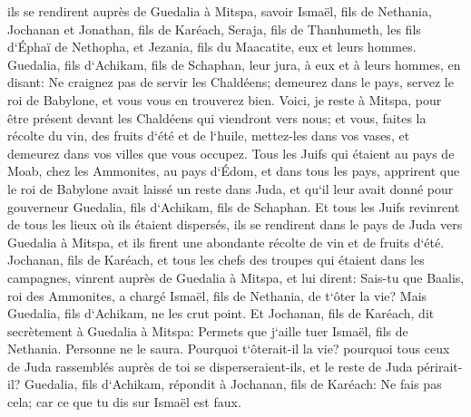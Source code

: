 \verse ils se rendirent auprès de Guedalia à Mitspa, savoir Ismaël, fils de Nethania, Jochanan et Jonathan, fils de Karéach, Seraja, fils de Thanhumeth, les fils d`Éphaï de Nethopha, et Jezania, fils du Maacatite, eux et leurs hommes. 
\verse Guedalia, fils d`Achikam, fils de Schaphan, leur jura, à eux et à leurs hommes, en disant: Ne craignez pas de servir les Chaldéens; demeurez dans le pays, servez le roi de Babylone, et vous vous en trouverez bien. 
\verse Voici, je reste à Mitspa, pour être présent devant les Chaldéens qui viendront vers nous; et vous, faites la récolte du vin, des fruits d`été et de l`huile, mettez-les dans vos vases, et demeurez dans vos villes que vous occupez. 
\verse Tous les Juifs qui étaient au pays de Moab, chez les Ammonites, au pays d`Édom, et dans tous les pays, apprirent que le roi de Babylone avait laissé un reste dans Juda, et qu`il leur avait donné pour gouverneur Guedalia, fils d`Achikam, fils de Schaphan. 
\verse Et tous les Juifs revinrent de tous les lieux où ils étaient dispersés, ils se rendirent dans le pays de Juda vers Guedalia à Mitspa, et ils firent une abondante récolte de vin et de fruits d`été. 
\verse Jochanan, fils de Karéach, et tous les chefs des troupes qui étaient dans les campagnes, vinrent auprès de Guedalia à Mitspa, 
\verse et lui dirent: Sais-tu que Baalis, roi des Ammonites, a chargé Ismaël, fils de Nethania, de t`ôter la vie? Mais Guedalia, fils d`Achikam, ne les crut point. 
\verse Et Jochanan, fils de Karéach, dit secrètement à Guedalia à Mitspa: Permets que j`aille tuer Ismaël, fils de Nethania. Personne ne le saura. Pourquoi t`ôterait-il la vie? pourquoi tous ceux de Juda rassemblés auprès de toi se disperseraient-ils, et le reste de Juda périrait-il? 
\verse Guedalia, fils d`Achikam, répondit à Jochanan, fils de Karéach: Ne fais pas cela; car ce que tu dis sur Ismaël est faux. 

